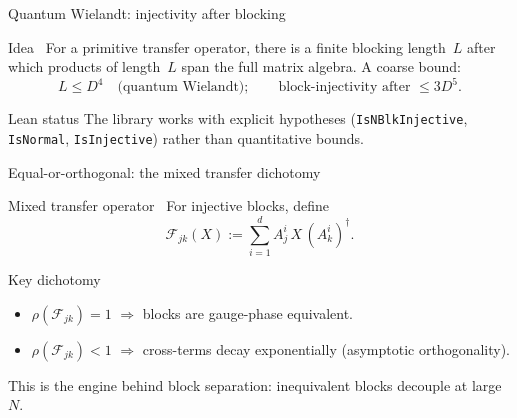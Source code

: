 \documentclass[aspectratio=169,10pt]{beamer}
\newcommand{\cF}{\mathcal{F}}
\begin{document}
\begin{frame}{Quantum Wielandt: injectivity after blocking}
    \vspace{-0.6em}

    \begin{block}{Idea~\cite{Sanz2010Quantum,Cirac2017Annals}}
        For a primitive transfer operator, there is a finite blocking length~$L$
        after which products of length~$L$ span the full matrix algebra.
        A coarse bound:
        \[
            L \le D^4 \quad \text{(quantum Wielandt)};\qquad
            \text{block-injectivity after }\le 3D^5.
        \]
    \end{block}

    \begin{block}{Lean status}
        The library works with explicit hypotheses
        (\texttt{IsNBlkInjective}, \texttt{IsNormal}, \texttt{IsInjective})
        rather than quantitative bounds.
    \end{block}
\end{frame}

\begin{frame}{Equal-or-orthogonal: the mixed transfer dichotomy}
    \vspace{-0.6em}

    \begin{block}{Mixed transfer operator~\cite{Perez-Garcia2007Matrix,Cirac2021Matrix}}
        For injective blocks, define
        \[
            \cF_{jk}(X) := \sum_{i=1}^d A_j^i\,X\,(A_k^i)^\dagger.
        \]
    \end{block}

    \begin{block}{Key dichotomy}
        \begin{itemize}\itemsep0.2em
            \item $\rho(\cF_{jk})=1$ $\Longrightarrow$
                  blocks are gauge-phase equivalent.
            \item $\rho(\cF_{jk})<1$ $\Longrightarrow$
                  cross-terms decay exponentially (asymptotic orthogonality).
        \end{itemize}
    \end{block}

    \textcolor{dimwhite}{\footnotesize This is the engine behind block separation: inequivalent blocks decouple at large~$N$.}
\end{frame}
\end{document}
